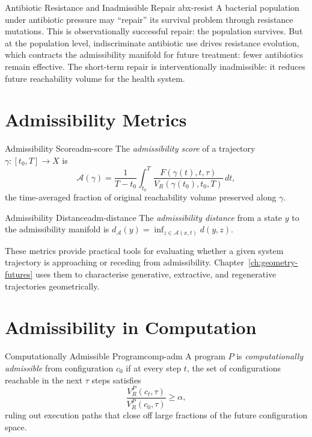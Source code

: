 \documentclass[12pt,twoside,openright]{book}
\newcommand{\csicon} {\marginpar{\tiny\color{DistBlue}\faCode}}
\newcommand{\bioicon}{\marginpar{\tiny\color{DistTeal}\faDna}}
\newcommand{\adm}{\mathcal{A}}
\begin{document}
\begin{example}{Antibiotic Resistance and Inadmissible Repair}%
  {abx-resist}
  \bioicon
  A bacterial population under antibiotic pressure may
  ``repair'' its survival problem through resistance
  mutations. This is observationally successful repair: the
  population survives. But at the population level,
  indiscriminate antibiotic use drives resistance evolution,
  which contracts the admissibility manifold for future
  treatment: fewer antibiotics remain effective. The
  short-term repair is interventionally inadmissible: it
  reduces future reachability volume for the health system.
\end{example}

\section{Admissibility Metrics}
\label{sec:ch14-metrics}

\begin{definition}{Admissibility Score}{adm-score}
  The \emph{admissibility score} of a trajectory
  $\gamma:[t_0,T]\to X$ is
  \[
    \mathcal{A}(\gamma)
    = \frac{1}{T-t_0} \int_{t_0}^T
      \frac{F(\gamma(t),t,\tau)}{V_R(\gamma(t_0),t_0,T)}\,dt,
  \]
  the time-averaged fraction of original reachability
  volume preserved along $\gamma$.
\end{definition}

\begin{definition}{Admissibility Distance}{adm-distance}
  The \emph{admissibility distance} from a state $y$ to the
  admissibility manifold is
  $d_\adm(y) = \inf_{z\in\adm(x,t)} d(y,z)$.
\end{definition}

These metrics provide practical tools for evaluating
whether a given system trajectory is approaching or
receding from admissibility. Chapter~\ref{ch:geometry-futures}
uses them to characterise generative, extractive, and
regenerative trajectories geometrically.

\section{Admissibility in Computation}
\label{sec:ch14-computation}

\csicon

\begin{definition}{Computationally Admissible Program}{comp-adm}
  A program $P$ is \emph{computationally admissible} from
  configuration $c_0$ if at every step $t$, the set of
  configurations reachable in the next $\tau$ steps
  satisfies
  \[
    \frac{V_R^P(c_t,\tau)}{V_R^P(c_0,\tau)} \ge \alpha,
  \]
  ruling out execution paths that close off large fractions
  of the future configuration space.
\end{definition}
\end{document}
